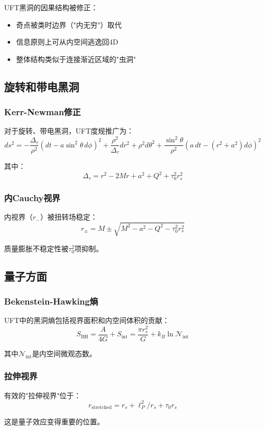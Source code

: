 UFT黑洞的因果结构被修正：
\begin{itemize}
    \item 奇点被类时边界（"内无穷"）取代
    \item 信息原则上可从内空间逃逸回4D
    \item 整体结构类似于连接渐近区域的"虫洞"
\end{itemize}

\subsection{旋转和带电黑洞}

\subsubsection{Kerr-Newman修正}

对于旋转、带电黑洞，UFT度规推广为：
\begin{equation}
    ds^2 = -\frac{\Delta_\tau}{\rho^2}\left(dt - a\sin^2\theta \, d\phi\right)^2 + \frac{\rho^2}{\Delta_\tau}dr^2 + \rho^2 d\theta^2 + \frac{\sin^2\theta}{\rho^2}\left(a \, dt - (r^2+a^2)d\phi\right)^2
\end{equation}

其中：
\begin{equation}
    \Delta_\tau = r^2 - 2Mr + a^2 + Q^2 + \tau_0^2 r_s^2
\end{equation}

\subsubsection{内Cauchy视界}

内视界（$r_-$）被扭转场稳定：
\begin{equation}
    r_{\pm} = M \pm \sqrt{M^2 - a^2 - Q^2 - \tau_0^2 r_s^2}
\end{equation}

质量膨胀不稳定性被$\tau_0^2$项抑制。

\subsection{量子方面}

\subsubsection{Bekenstein-Hawking熵}

UFT中的黑洞熵包括视界面积和内空间体积的贡献：
\begin{equation}
    S_{\text{BH}} = \frac{A}{4G} + S_{\text{int}} = \frac{\pi r_s^2}{G} + k_B \ln \mathcal{N}_{\text{int}}
\end{equation}

其中$\mathcal{N}_{\text{int}}$是内空间微观态数。

\subsubsection{拉伸视界}

有效的"拉伸视界"位于：
\begin{equation}
    r_{\text{stretched}} = r_s + \ell_P^2/r_s + \tau_0 r_s
\end{equation}

这是量子效应变得重要的位置。
